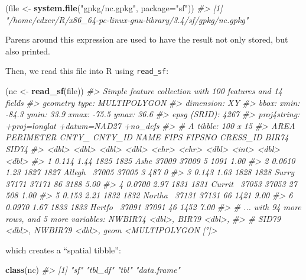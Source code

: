 \documentclass[]{krantz}
\newenvironment{Shaded}{\begin{snugshade}}{\end{snugshade}}
\newcommand{\KeywordTok}[1]{\textcolor[rgb]{0.13,0.29,0.53}{\textbf{#1}}}
\newcommand{\DataTypeTok}[1]{\textcolor[rgb]{0.13,0.29,0.53}{#1}}
\newcommand{\StringTok}[1]{\textcolor[rgb]{0.31,0.60,0.02}{#1}}
\newcommand{\CommentTok}[1]{\textcolor[rgb]{0.56,0.35,0.01}{\textit{#1}}}
\newcommand{\NormalTok}[1]{#1}
\theoremstyle{definition}
\theoremstyle{definition}
\theoremstyle{definition}
\theoremstyle{remark}
\begin{document}
\begin{Shaded}
\begin{Highlighting}[]
\NormalTok{(file <-}\StringTok{ }\KeywordTok{system.file}\NormalTok{(}\StringTok{"gpkg/nc.gpkg"}\NormalTok{, }\DataTypeTok{package=}\StringTok{"sf"}\NormalTok{))}
\CommentTok{#> [1] "/home/edzer/R/x86_64-pc-linux-gnu-library/3.4/sf/gpkg/nc.gpkg"}
\end{Highlighting}
\end{Shaded}

Parens around this expression are used to have the result not only
stored, but also printed.

Then, we read this file into R using \texttt{read\_sf}:

\begin{Shaded}
\begin{Highlighting}[]
\NormalTok{(nc <-}\StringTok{ }\KeywordTok{read_sf}\NormalTok{(file))}
\CommentTok{#> Simple feature collection with 100 features and 14 fields}
\CommentTok{#> geometry type:  MULTIPOLYGON}
\CommentTok{#> dimension:      XY}
\CommentTok{#> bbox:           xmin: -84.3 ymin: 33.9 xmax: -75.5 ymax: 36.6}
\CommentTok{#> epsg (SRID):    4267}
\CommentTok{#> proj4string:    +proj=longlat +datum=NAD27 +no_defs}
\CommentTok{#> # A tibble: 100 x 15}
\CommentTok{#>     AREA PERIMETER CNTY_ CNTY_ID NAME    FIPS  FIPSNO CRESS_ID BIR74 SID74}
\CommentTok{#>    <dbl>     <dbl> <dbl>   <dbl> <chr>   <chr>  <dbl>    <int> <dbl> <dbl>}
\CommentTok{#> 1 0.114       1.44  1825    1825 Ashe    37009  37009        5  1091  1.00}
\CommentTok{#> 2 0.0610      1.23  1827    1827 Allegh~ 37005  37005        3   487  0   }
\CommentTok{#> 3 0.143       1.63  1828    1828 Surry   37171  37171       86  3188  5.00}
\CommentTok{#> 4 0.0700      2.97  1831    1831 Currit~ 37053  37053       27   508  1.00}
\CommentTok{#> 5 0.153       2.21  1832    1832 Northa~ 37131  37131       66  1421  9.00}
\CommentTok{#> 6 0.0970      1.67  1833    1833 Hertfo~ 37091  37091       46  1452  7.00}
\CommentTok{#> # ... with 94 more rows, and 5 more variables: NWBIR74 <dbl>, BIR79 <dbl>,}
\CommentTok{#> #   SID79 <dbl>, NWBIR79 <dbl>, geom <MULTIPOLYGON [°]>}
\end{Highlighting}
\end{Shaded}

which creates a ``spatial tibble'':

\begin{Shaded}
\begin{Highlighting}[]
\KeywordTok{class}\NormalTok{(nc)}
\CommentTok{#> [1] "sf"         "tbl_df"     "tbl"        "data.frame"}
\end{Highlighting}
\end{Shaded}
\end{document}
